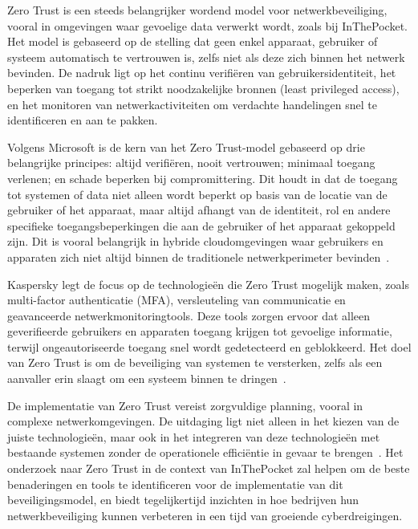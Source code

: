 

Zero Trust is een steeds belangrijker wordend model voor netwerkbeveiliging, vooral in omgevingen waar gevoelige data verwerkt wordt, zoals bij InThePocket. Het model is gebaseerd op de stelling dat geen enkel apparaat, gebruiker of systeem automatisch te vertrouwen is, zelfs niet als deze zich binnen het netwerk bevinden. De nadruk ligt op het continu verifiëren van gebruikersidentiteit, het beperken van toegang tot strikt noodzakelijke bronnen (least privileged access), en het monitoren van netwerkactiviteiten om verdachte handelingen snel te identificeren en aan te pakken.

Volgens Microsoft is de kern van het Zero Trust-model gebaseerd op drie belangrijke principes: altijd verifiëren, nooit vertrouwen; minimaal toegang verlenen; en schade beperken bij compromittering. Dit houdt in dat de toegang tot systemen of data niet alleen wordt beperkt op basis van de locatie van de gebruiker of het apparaat, maar altijd afhangt van de identiteit, rol en andere specifieke toegangsbeperkingen die aan de gebruiker of het apparaat gekoppeld zijn. Dit is vooral belangrijk in hybride cloudomgevingen waar gebruikers en apparaten zich niet altijd binnen de traditionele netwerkperimeter bevinden​~\autocite{Microsoft2024}.

Kaspersky legt de focus op de technologieën die Zero Trust mogelijk maken, zoals multi-factor authenticatie (MFA), versleuteling van communicatie en geavanceerde netwerkmonitoringtools. Deze tools zorgen ervoor dat alleen geverifieerde gebruikers en apparaten toegang krijgen tot gevoelige informatie, terwijl ongeautoriseerde toegang snel wordt gedetecteerd en geblokkeerd. Het doel van Zero Trust is om de beveiliging van systemen te versterken, zelfs als een aanvaller erin slaagt om een systeem binnen te dringen​~\autocite{Kaspersky2024}.

De implementatie van Zero Trust vereist zorgvuldige planning, vooral in complexe netwerkomgevingen. De uitdaging ligt niet alleen in het kiezen van de juiste technologieën, maar ook in het integreren van deze technologieën met bestaande systemen zonder de operationele efficiëntie in gevaar te brengen​​~\autocite{Kaspersky2024}.
Het onderzoek naar Zero Trust in de context van InThePocket zal helpen om de beste benaderingen en tools te identificeren voor de implementatie van dit beveiligingsmodel, en biedt tegelijkertijd inzichten in hoe bedrijven hun netwerkbeveiliging kunnen verbeteren in een tijd van groeiende cyberdreigingen.

